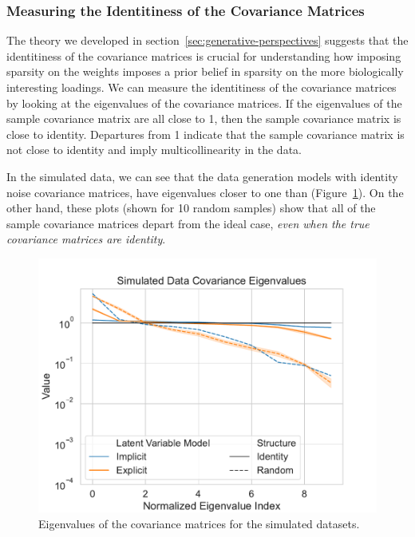 \subsubsection{Measuring the Identitiness of the Covariance Matrices}
The theory we developed in section~\ref{sec:generative-perspectives} suggests that the identitiness of the covariance matrices is crucial for understanding how imposing sparsity on the \gls{weights} imposes a prior belief in sparsity on the more biologically interesting loadings.
We can measure the identitiness of the covariance matrices by looking at the eigenvalues of the covariance matrices.
If the eigenvalues of the sample covariance matrix are all close to 1, then the sample covariance matrix is close to identity.
Departures from 1 indicate that the sample covariance matrix is not close to identity and imply multicollinearity in the data.

In the simulated data, we can see that the data generation models with identity noise covariance matrices, have eigenvalues closer to one than (Figure~\ref{fig:covariance-eigenvalues-simulated-low}).
On the other hand, these plots (shown for 10 random samples) show that all of the sample covariance matrices depart from the ideal case, \textit{even when the true covariance matrices are identity}.

\begin{figure}
    \centering
    \includegraphics[width=0.8\linewidth]{figures/covariance/simulated_covariance_eigenvalues_low}
    \caption{Eigenvalues of the covariance matrices for the simulated datasets.}\label{fig:covariance-eigenvalues-simulated-low}
\end{figure}

